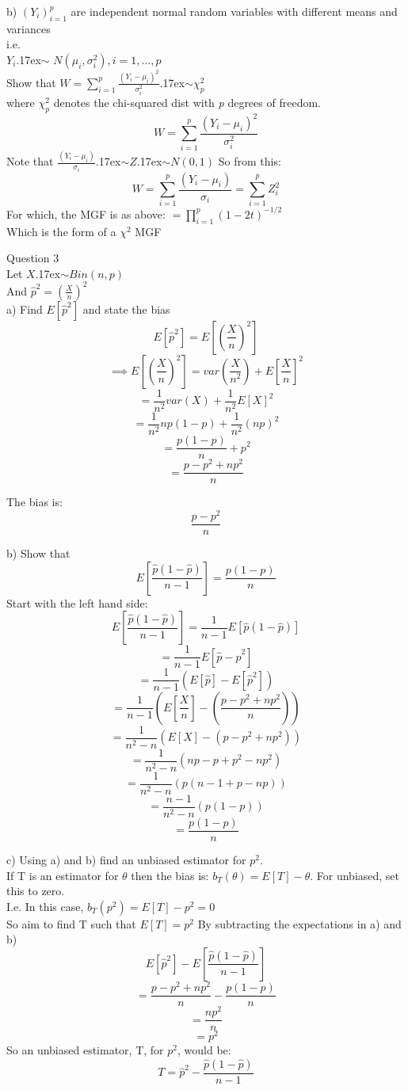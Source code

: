 \documentclass[a4paper]{article}
\begin{document}
	
	b) $(Y_i)_{i=1}^p$ are independent normal random variables with different means and variances\\
	i.e. \\$Y_i${\raise.17ex\hbox{$\scriptstyle\mathtt{\sim}$}} $N(\mu_i,\sigma^2_i), i=1,...,p$\\
	Show that 
	$W=\sum_{i=1}^{p}\frac{(Y_i-\mu_i)^2}{\sigma_i^2}${\raise.17ex\hbox{$\scriptstyle\mathtt{\sim}$}}$\chi_p^2$\\
	where $\chi_p^2$ denotes the chi-squared dist with \textit{p} degrees of freedom.
	$$W=\sum_{i=1}^{p}\frac{(Y_i-\mu_i)^2}{\sigma_i^2}$$
	Note that $\frac{(Y_i-\mu_i)}{\sigma_i}${\raise.17ex\hbox{$\scriptstyle\mathtt{\sim}$}}$Z${\raise.17ex\hbox{$\scriptstyle\mathtt{\sim}$}}$N(0,1)$
	So from this:
	$$W=\sum_{i=1}^{p}\frac{(Y_i-\mu_i)}{\sigma_i}=\sum_{i=1}^{p}Z_i^2$$
	For which, the MGF is as above: $=\prod_{i=1}^{p}(1-2t)^{-1/2}$\\
	Which is the form of a $\chi^2$ MGF 
	
	
	
	\newpage
	Question 3\\
	Let $X${\raise.17ex\hbox{$\scriptstyle\mathtt{\sim}$}}$Bin(n,p)$\\
	And
	$\hat{p}^2=\left(\frac{X}{n}\right)^2$\\
	
	a) Find $E\left[\hat{p}^2\right]$ and state the bias\\
	$$E[\hat{p}^2]=E[(\frac{X}{n})^2]$$
	$$\implies E\left[(\frac{X}{n})^2\right]=var(\frac{X}{n^2})+E\left[\frac{X}{n}\right]^2$$
	$$=\frac{1}{n^2}var(X)+\frac{1}{n^2}E\left[X\right]^2$$
	$$=\frac{1}{n^2}np(1-p)+\frac{1}{n^2}(np)^2$$
	$$=\frac{p(1-p)}{n}+p^2$$
	$$=\frac{p-p^2+np^2}{n}$$
	
	The bias is: $$\frac{p-p^2}{n}$$
	
	
	
	b) Show that
	$$E\left[\frac{\hat{p}(1-\hat{p})}{n-1}\right]=\frac{p(1-p)}{n}$$
	Start with the left hand side:
	$$E\left[\frac{\hat{p}(1-\hat{p})}{n-1}\right]=\frac{1}{n-1}E\left[\hat{p}(1-\hat{p})\right]$$
	$$=\frac{1}{n-1}E\left[\hat{p} -\hat{p}^2\right]$$
	$$=\frac{1}{n-1}(E[\hat{p}] -E[\hat{p}^2])$$
	$$=\frac{1}{n-1}\left(E[\frac{X}{n}]-(\frac{p-p^2+np^2}{n})\right)$$
	$$=\frac{1}{n^2-n}\left(E[X]-(p-p^2+np^2)\right)$$
	$$=\frac{1}{n^2-n}\left(np-p+p^2-np^2\right)$$
	$$=\frac{1}{n^2-n}\left(p(n-1+p-np)\right)$$
	$$=\frac{n-1}{n^2-n}\left(p(1-p)\right)$$
	$$=\frac{p(1-p)}{n}$$
	
	
	c) Using a) and b) find an unbiased estimator for $p^2$.\\
	If T is an estimator for $\theta$ then the bias is: $b_T (\theta) = E[T] - \theta$. For unbiased, set this to zero.\\
	I.e. In this case, $b_T (p^2) = E[T]-p^2=0$\\
	So aim to find T such that $E[T]=p^2$
	By subtracting the expectations in a) and b)
	$$E[\hat{p}^2]-E\left[\frac{\hat{p}(1-\hat{p})}{n-1}\right]$$
	$$=\frac{p-p^2+np^2}{n}-\frac{p(1-p)}{n}$$
	$$=\frac{np^2}{n}$$
	$$=p^2$$
	So an unbiased estimator, T, for $p^2$, would be:
	$$T=\hat{p}^2-\frac{\hat{p}(1-\hat{p})}{n-1}$$
	
\end{document}
